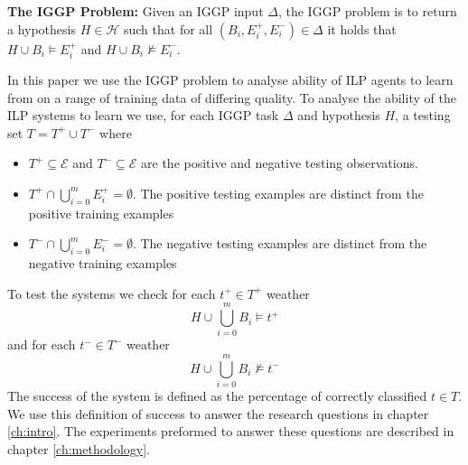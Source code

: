 \textbf{The IGGP Problem:} Given an IGGP input $\Delta$, the IGGP problem is to return a hypothesis $H \in \mathscr{H}$ such that for all $(B_i,E_i^+,E_i^-) \in \Delta$ it holds that $H \cup B_i \models E_i^+$ and
$H \cup B_i \not\models E_i^-$.

In this paper we use the IGGP problem to analyse ability of ILP agents to learn from on a range of training data of differing quality. To analyse the ability of the ILP systems to learn we use, for each IGGP task $\Delta$ and hypothesis $H$, a testing set $T = T^+\cup T^-$ where
\begin{itemize}
	\item $T^+ \subseteq \mathscr{E}$ and $T^-\subseteq \mathscr{E}$ are the positive and negative testing observations.
	\item $T^+ \cap \bigcup_{i=0}^m E_i^+  = \emptyset$. The positive testing examples are distinct from the positive training examples
	\item $T^- \cap \bigcup_{i=0}^m E_i^-  = \emptyset$. The negative testing examples are distinct from the negative training examples
\end{itemize}
To test the systems we check for each $t^+ \in T^+$ weather\[ H \cup \bigcup_{i=0}^m B_i \models t^+\] and for each $t^- \in T^-$  weather \[ H \cup \bigcup_{i=0}^m B_i \not\models t^-\]
The success of the system is defined as the percentage of correctly classified $t \in T$. We use this definition of success to answer the research questions in chapter \ref{ch:intro}. The experiments preformed to answer these questions are described in chapter \ref{ch:methodology}.

